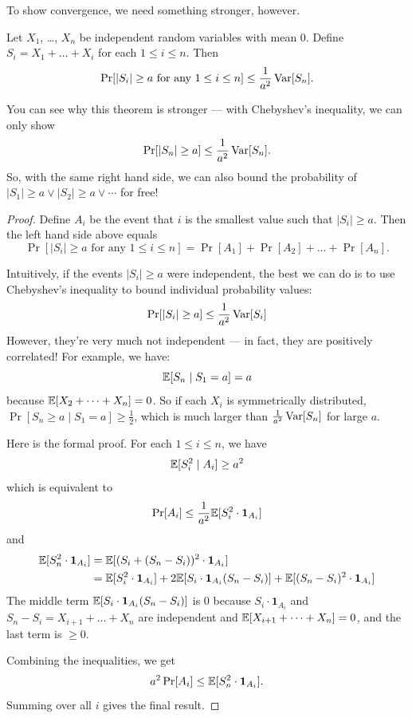 To show convergence, we need something stronger, however.
\begin{theorem}
	Let $X_1$, \dots, $X_n$ be independent random variables with mean $0$.
	Define $S_i = X_1+\dots+X_i$ for each $1 \leq i \leq n$.
	Then
	\[ \Pr[|S_i| \geq a \text{ for any }1 \leq i \leq n]
		\leq \frac{1}{a^2} \operatorname{Var}[S_n]. \]
\end{theorem}
You can see why this theorem is stronger --- with Chebyshev's inequality, we can only show
\[ \Pr[|S_n| \geq a] \leq \frac{1}{a^2} \operatorname{Var}[S_n]. \]
So, with the same right hand side, we can also bound the probability of
$|S_1|\geq a \vee |S_2| \geq a \vee \cdots$ for free!
\begin{proof}
	Define $A_i$ be the event that $i$ is the smallest value such that $|S_i|\geq a$. Then the left
	hand side above equals
	\[ \Pr[|S_i| \geq a \text{ for any }1 \leq i \leq n] = \Pr[A_1]+\Pr[A_2]+\dots+\Pr[A_n]. \]

	Intuitively, if the events $|S_i|\geq a$ were independent,
	the best we can do is to use Chebyshev's inequality to bound individual probability values:
	\[ \Pr[|S_i|\geq a] \leq \frac{1}{a^2} \operatorname{Var}[S_i] \]
	However, they're very much not independent --- in fact, they are positively correlated!
	For example, we have:
	\[ \mathbb E[S_n \mid S_1 = a] = a \]
	because $\mathbb E[X_2+\dots+X_n] = 0$.
	So if each $X_i$ is symmetrically distributed, $\Pr[S_n \geq a \mid S_1 = a] \geq \frac{1}{2}$,
	which is much larger than $\frac{1}{a^2} \operatorname{Var}[S_n]$ for large $a$.

	Here is the formal proof.
	For each $1 \leq i \leq n$, we have
	\[ \mathbb E[S_i^2 \mid A_i] \geq a^2 \]
	which is equivalent to
	\[ \Pr[A_i] \leq \frac{1}{a^2} \mathbb E[S_i^2 \cdot \mathbf{1}_{A_i}] \]
	and
	\begin{align*}
		\mathbb E[S_n^2 \cdot \mathbf{1}_{A_i}]
		&= \mathbb E[(S_i + (S_n-S_i))^2 \cdot \mathbf{1}_{A_i}] \\
		&= \mathbb E[S_i^2 \cdot \mathbf{1}_{A_i}]
		+ 2\mathbb E[S_i  \cdot \mathbf{1}_{A_i} (S_n-S_i)]
		+ \mathbb E[(S_n-S_i)^2 \cdot \mathbf{1}_{A_i}] \\
	\end{align*}
	The middle term $\mathbb E[S_i  \cdot \mathbf{1}_{A_i} (S_n-S_i)]$ is $0$
	because $S_i  \cdot \mathbf{1}_{A_i}$ and $S_n-S_i = X_{i+1}+\dots+X_n$ are independent
	and $\mathbb E[X_{i+1}+\dots+X_n]=0$,
	and the last term is $\geq 0$.

	Combining the inequalities, we get
	\[ a^2 \Pr[A_i] \leq \mathbb E[S_n^2 \cdot \mathbf{1}_{A_i}]. \]
	Summing over all $i$ gives the final result.
\end{proof}

